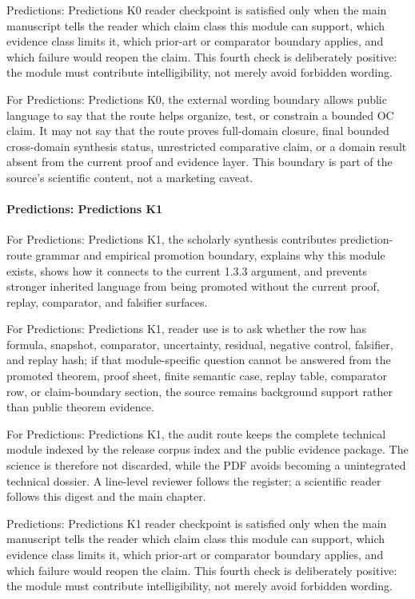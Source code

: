 Predictions: Predictions K0 reader checkpoint is satisfied only when the main manuscript tells the reader which claim class this module can support, which evidence class limits it, which prior-art or comparator boundary applies, and which failure would reopen the claim. This fourth check is deliberately positive: the module must contribute intelligibility, not merely avoid forbidden wording.


For Predictions: Predictions K0, the external wording boundary allows public language to say that the route helps organize, test, or constrain a bounded OC claim. It may not say that the route proves full-domain closure, final bounded cross-domain synthesis status, unrestricted comparative claim, or a domain result absent from the current proof and evidence layer. This boundary is part of the source's scientific content, not a marketing caveat.


\paragraph{Predictions: Predictions K1}

For Predictions: Predictions K1, the scholarly synthesis contributes prediction-route grammar and empirical promotion boundary, explains why this module exists, shows how it connects to the current 1.3.3 argument, and prevents stronger inherited language from being promoted without the current proof, replay, comparator, and falsifier surfaces.


For Predictions: Predictions K1, reader use is to ask whether the row has formula, snapshot, comparator, uncertainty, residual, negative control, falsifier, and replay hash; if that module-specific question cannot be answered from the promoted theorem, proof sheet, finite semantic case, replay table, comparator row, or claim-boundary section, the source remains background support rather than public theorem evidence.


For Predictions: Predictions K1, the audit route keeps the complete technical module indexed by the release corpus index and the public evidence package. The science is therefore not discarded, while the PDF avoids becoming a unintegrated technical dossier. A line-level reviewer follows the register; a scientific reader follows this digest and the main chapter.


Predictions: Predictions K1 reader checkpoint is satisfied only when the main manuscript tells the reader which claim class this module can support, which evidence class limits it, which prior-art or comparator boundary applies, and which failure would reopen the claim. This fourth check is deliberately positive: the module must contribute intelligibility, not merely avoid forbidden wording.


